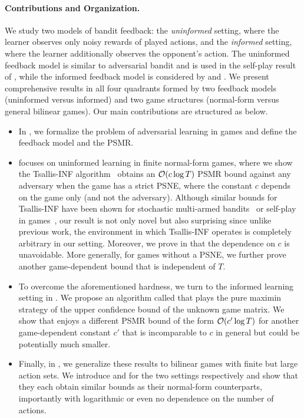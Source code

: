 \paragraph{Contributions and Organization.}
We study two models of bandit feedback: the \emph{uninformed} setting, where the learner observes only noisy rewards of played actions, and the \emph{informed} setting, where the learner additionally observes the opponent's action.
The uninformed feedback model is similar to adversarial bandit and is used in the self-play result of \citet{ito2025instancedependent}, while the informed feedback model is considered by \citet{odonoghue2021matrix} and \citet{maiti2025limitations}.
We present comprehensive results in all four quadrants formed by two feedback models (uninformed versus informed) and two game structures (normal-form versus general bilinear games).
Our main contributions are structured as below.
\begin{itemize}[itemsep=2pt,topsep=2pt]
    \item In , we formalize the problem of adversarial learning in games and define the feedback model and the PSMR.
    \item {} focuses on uninformed learning in finite normal-form games, where we show the Tsallis-INF algorithm~\citep{zimmert2021tsallisinf} obtains an $\mathcal{O}(c \log T)$ PSMR bound against any adversary when the game has a strict PSNE, where the constant $c$ depends on the game only (and not the adversary).
    Although similar bounds for Tsallis-INF have been shown for stochastic multi-armed bandits~\citep{zimmert2021tsallisinf} %
    or self-play in games~\citep{ito2025instancedependent},
    our result is not only novel but also surprising since unlike previous work, the environment in which Tsallis-INF operates is completely arbitrary in our setting. %
    Moreover, we prove in  that the dependence on $c$ is unavoidable. 
    More generally, for games without a PSNE, we further prove another game-dependent bound that is independent of $T$. 
    \item To overcome the aforementioned hardness, we turn to the informed learning setting in . We propose an algorithm called \PureUCB{} that plays the pure maximin strategy of the upper confidence bound of the unknown game matrix. %
    We show that \PureUCB{} enjoys a different PSMR bound of the form $\mathcal{O}(c' \log T)$ for another game-dependent constant $c'$ that is incomparable to $c$ in general but could be potentially much smaller. 
    \item Finally, in , we generalize these results to bilinear games with finite but large action sets. We introduce \TsallisSPM{} and \PureLinUCB{} for the two settings respectively and show that they each obtain similar bounds as their normal-form counterparts, importantly with logarithmic or even no dependence on the number of actions.  %
\end{itemize}
